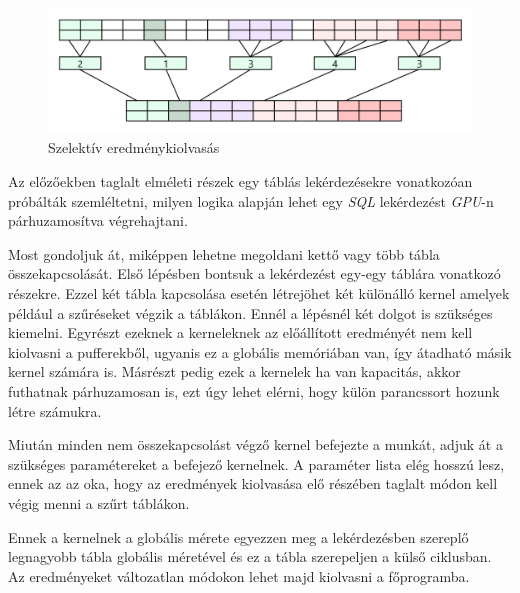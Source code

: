 \begin{figure}[h!]
\centering
\includegraphics[width=\textwidth]{images/copy_02.png}
\caption{Szelektív eredménykiolvasás}
\label{fig:copy_02}
\end{figure}

\newpage
{}

Az előzőekben taglalt elméleti részek egy táblás lekérdezésekre vonatkozóan próbálták szemléltetni, milyen logika alapján lehet egy \textit{SQL} lekérdezést \textit{GPU}-n párhuzamosítva végrehajtani.

Most gondoljuk át, miképpen lehetne megoldani kettő vagy több tábla összekapcsolását. 
Első lépésben bontsuk a lekérdezést egy-egy táblára vonatkozó részekre. Ezzel két tábla kapcsolása esetén létrejöhet két különálló kernel amelyek például a szűréseket végzik a táblákon. Ennél a lépésnél két dolgot is szükséges kiemelni. Egyrészt ezeknek a kerneleknek az előállított eredményét nem kell kiolvasni a pufferekből, ugyanis ez a globális memóriában van, így átadható másik kernel számára is. Másrészt pedig ezek a kernelek ha van kapacitás, akkor futhatnak párhuzamosan is, ezt úgy lehet elérni, hogy külön parancssort hozunk létre számukra.

Miután minden nem összekapcsolást végző kernel befejezte a munkát, adjuk át a szükséges paramétereket a befejező kernelnek. A paraméter lista elég hosszú lesz, ennek az az oka, hogy az eredmények kiolvasása elő részében taglalt módon kell végig menni a szűrt táblákon. 

Ennek a kernelnek a globális mérete egyezzen meg a lekérdezésben szereplő legnagyobb tábla globális méretével és ez a tábla szerepeljen a külső ciklusban. Az eredményeket változatlan módokon lehet majd kiolvasni a főprogramba.

